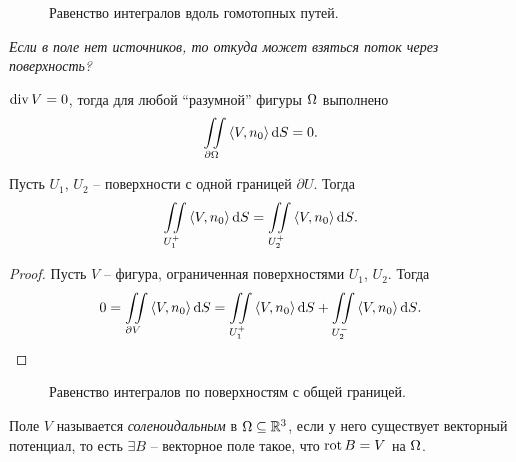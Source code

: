 \begin{figure}[h!]
    \centering
    \caption{Равенство интегралов вдоль гомотопных путей.}
\end{figure}

\textit{Если в поле нет источников, то откуда может взяться поток через поверхность?}
\begin{remark}
    $\operatorname{div} V = 0$, тогда для любой ``разумной'' фигуры $\Omega$ выполнено
\[
    \iint\limits_{\partial \Omega}{\langle V, n_0 \rangle \,\mathrm{d} S} = 0
.\] 
\end{remark}

\begin{remark}
    Пусть $U_1$, $U_2$ -- поверхности с одной границей $\partial U$. Тогда
    \[
        \iint\limits_{U_1^+}{\langle V, n_0 \rangle \,\mathrm{d} S} = \iint\limits_{U_2^+}{\langle V, n_0 \rangle \,\mathrm{d} S}
    .\]
\end{remark}
\begin{proof}
    Пусть $V$ -- фигура, ограниченная поверхностями $U_1$, $U_2$. Тогда
    \[
        0 = \iint\limits_{\partial V}{\langle V, n_0 \rangle \,\mathrm{d} S} = \iint\limits_{U_1^+}{\langle V, n_0 \rangle \,\mathrm{d} S}
        + \iint\limits_{U_2^-}{\langle V, n_0 \rangle \,\mathrm{d} S}
    .\]
\end{proof}

\begin{figure}[h!]
    \centering
    \caption{Равенство интегралов по поверхностям с общей границей.}
\end{figure}

\begin{definition}
    Поле $V$ называется \textit{соленоидальным} в $\Omega \subseteq \mathbb{R}^3$, 
    если у него существует векторный потенциал, то есть
    $\exists B$ -- векторное поле такое, что $\operatorname{rot} B = V$ на $\Omega$.
\end{definition}


